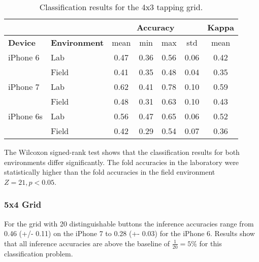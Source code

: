 \begin{table}[h!]
  \centering
\begin{tabular}{|l|l|c|c|c|c|c|}
  \cline{3-7}
  \multicolumn{2}{c}{} & \multicolumn{4}{|c|}{\textbf{Accuracy}} & \textbf{Kappa} \\
  \hline
  \textbf{Device} & \textbf{Environment} & mean &   min &   max  & std &  mean \\
  \hline
  iPhone 6 & Lab &      0.47 &     0.36 &     0.56 &     0.06 &        0.42 \\
  & Field &      0.41 &     0.35 &     0.48 &     0.04 &        0.35 \\
  \hline
iPhone 7 & Lab &      0.62 &     0.41 &     0.78 &     0.10 &        0.59 \\
  & Field &      0.48 &     0.31 &     0.63 &     0.10 &        0.43 \\
  \hline
iPhone 6s & Lab &      0.56 &     0.47 &     0.65 &     0.06 &        0.52 \\
  & Field &      0.42 &     0.29 &     0.54 &     0.07 &        0.36 \\
  \hline
\end{tabular}
  \caption{Classification results for the 4x3 tapping grid.}
\end{table}

The Wilcoxon signed-rank test shows that the classification results for both environments differ significantly. The fold accuracies in the laboratory were statistically higher than the fold accuracies in the field environment $Z = 21, p < 0.05$.

\subsubsection{5x4 Grid}
For the grid with 20 distinguishable buttons the inference accuracies range from 0.46 (+/- 0.11) on the iPhone 7 to 0.28 (+- 0.03) for the iPhone 6. Results show that all inference accuracies are above the baseline of $\frac{1}{20} = 5\%$ for this classification problem.

